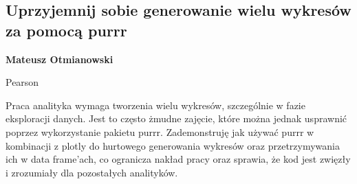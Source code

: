 \documentclass[\main/boa.tex]{subfiles}
\begin{document}
\subsection{Uprzyjemnij sobie generowanie wielu wykresów za pomocą purrr}

\begin{minipage}{0.915\textwidth}
	\centering
  {\bf {}  Mateusz Otmianowski}
\end{minipage}



\begin{affiliations}
\begin{minipage}{0.915\textwidth}
\centering
Pearson \\[-2pt]
\end{minipage}
\end{affiliations}

\vskip 0.3cm

Praca analityka wymaga tworzenia wielu wykresów, szczególnie w fazie eksploracji danych. Jest to często żmudne zajęcie, które można jednak usprawnić poprzez wykorzystanie pakietu purrr. Zademonstruję jak używać purrr w kombinacji z plotly do hurtowego generowania wykresów oraz przetrzymywania ich w data frame’ach, co ogranicza nakład pracy oraz sprawia, że kod jest zwięzły i zrozumiały dla pozostałych analityków. 
\end{document}
